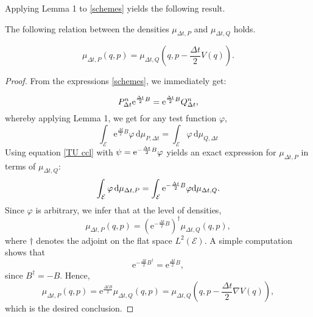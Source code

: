 Applying Lemma 1 to \eqref{schemes} yields the following result.
\begin{prop}\label{prop:mup_expression}
  The following relation between the densities $\mu_{\Delta t,P}$ and $\mu_{\Delta t,Q}$ holds.

  \begin{equation}
    \label{mu P expression}
    \mu_{\Delta t,P}(q,p) = \mu_{\Delta t,Q}\left(q,p-\frac{\Delta t}2V(q)\right).
  \end{equation}
\end{prop}
\begin{proof}
  From the expressions \eqref{schemes}, we immediately get:

\begin{equation}
  \label{TU relation}
  P_{\Delta t}^n\mathrm{e}^{\frac{\Delta t}2B}=\mathrm{e}^{\frac{\Delta t}2B}Q_{\Delta t}^n,
\end{equation}
whereby applying Lemma 1, we get for any test function $\varphi$,
\begin{equation}
  \label{TU ccl}
  \int_{\mathcal E}\mathrm e^{\frac{\Delta t}2B}\varphi\, \mathrm{d}\mu_{P,\Delta t}=\int_{\mathcal E}\varphi\, \mathrm{d}\mu_{Q,\Delta t}
\end{equation}
Using equation \eqref{TU ccl} with $\psi=\mathrm{e}^{-\frac{\Delta t}2B}\varphi$ yields an exact expression for $\mu_{\Delta t,P}$ in terms of $\mu_{\Delta t,Q}$:
\begin{equation}
  \label{pi P expression}
  \int_{\mathcal E}\varphi\, \mathrm{d}\mu_{\Delta t,P} = \int_{\mathcal E}\mathrm{e}^{-\frac{\Delta t}2B}\varphi \mathrm{d}\mu_{\Delta t,Q}.
\end{equation}
Since $\varphi$ is arbitrary, we infer that at the level of densities,
\begin{equation}
  \mu_{\Delta t,P}(q,p)=\left(\mathrm{e}^{-\frac{\Delta t}2B}\right)^\dagger\mu_{\Delta t,Q}(q,p),
\end{equation}
where $\dagger$ denotes the adjoint on the flat space $L^2(\mathcal E)$. A simple computation shows that 
$$\mathrm e^{-\frac{\Delta t}2 B^\dagger}=\mathrm{e}^{\frac{\Delta t}2B},$$
since $B^\dagger=-B$.
Hence,
\begin{equation}\label{prop1 ccl}
  \mu_{\Delta t,P}(q,p) = \mathrm{e}^{\frac{\Delta t B}2}\mu_{\Delta t,Q}(q,p)=\mu_{\Delta t,Q}\left(q,p-\frac{\Delta t}2\nabla V(q)\right),
\end{equation}
which is the desired conclusion.
\end{proof}

